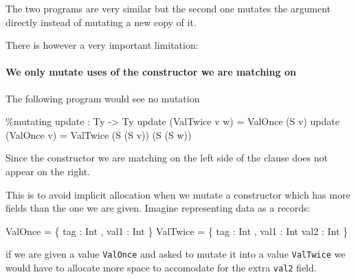 \documentclass[
]{article}
\newenvironment{Shaded}{}{}
\newcommand{\DataTypeTok}[1]{\textcolor[rgb]{0.56,0.13,0.00}{#1}}
\newcommand{\NormalTok}[1]{#1}
\newcommand{\OperatorTok}[1]{\textcolor[rgb]{0.40,0.40,0.40}{#1}}
\newcommand{\OtherTok}[1]{\textcolor[rgb]{0.00,0.44,0.13}{#1}}
\begin{document}
The two programs are very similar but the second one mutates the
argument directly instead of mutating a new copy of it.

There is however a very important limitation:

\hypertarget{we-only-mutate-uses-of-the-constructor-we-are-matching-on}{%
\paragraph{We only mutate uses of the constructor we are matching
on}\label{we-only-mutate-uses-of-the-constructor-we-are-matching-on}}

The following program would see no mutation

\begin{Shaded}
\begin{Highlighting}[]
\OperatorTok{\%}\NormalTok{mutating}
\NormalTok{update }\OperatorTok{:} \DataTypeTok{Ty} \OtherTok{{-}\textgreater{}} \DataTypeTok{Ty}
\NormalTok{update (}\DataTypeTok{ValTwice}\NormalTok{ v w) }\OtherTok{=} \DataTypeTok{ValOnce}\NormalTok{ (}\DataTypeTok{S}\NormalTok{ v)}
\NormalTok{update (}\DataTypeTok{ValOnce}\NormalTok{ v) }\OtherTok{=} \DataTypeTok{ValTwice}\NormalTok{ (}\DataTypeTok{S}\NormalTok{ (}\DataTypeTok{S}\NormalTok{ v)) (}\DataTypeTok{S}\NormalTok{ (}\DataTypeTok{S}\NormalTok{ w))}
\end{Highlighting}
\end{Shaded}

Since the constructor we are matching on the left side of the clause
does not appear on the right.

This is to avoid implicit allocation when we mutate a constructor which
has more fields than the one we are given. Imagine representing data as
a records:

\begin{Shaded}
\begin{Highlighting}[]
\DataTypeTok{ValOnce} \OtherTok{=}\NormalTok{ \{ tag }\OperatorTok{:} \DataTypeTok{Int}\NormalTok{ , val1 }\OperatorTok{:} \DataTypeTok{Int}\NormalTok{ \}}
\DataTypeTok{ValTwice} \OtherTok{=}\NormalTok{ \{ tag }\OperatorTok{:} \DataTypeTok{Int}\NormalTok{ , val1 }\OperatorTok{:} \DataTypeTok{Int}\NormalTok{ val2 }\OperatorTok{:} \DataTypeTok{Int}\NormalTok{ \}}
\end{Highlighting}
\end{Shaded}

if we are given a value \texttt{ValOnce} and asked to mutate it into a
value \texttt{ValTwice} we would have to allocate more space to
accomodate for the extra \texttt{val2} field.
\end{document}
